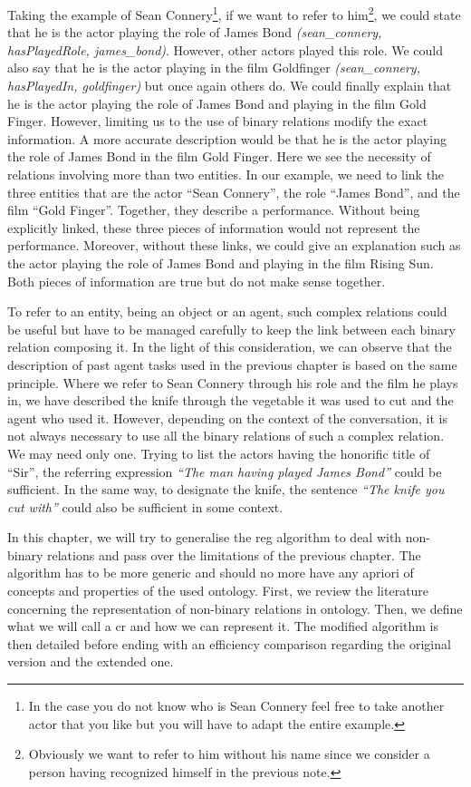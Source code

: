 Taking the example of Sean Connery\footnote{In the case you do not know who is Sean Connery feel free to take another actor that you like but you will have to adapt the entire example.}, if we want to refer to him\footnote{Obviously we want to refer to him without his name since we consider a person having recognized himself in the previous note.}, we could state that he is the actor playing the role of James Bond \textit{(sean\_connery, hasPlayedRole, james\_bond)}. However, other actors played this role. We could also say that he is the actor playing in the film Goldfinger \textit{(sean\_connery, hasPlayedIn, goldfinger)} but once again others do. We could finally explain that he is the actor playing the role of James Bond and playing in the film Gold Finger. However, limiting us to the use of binary relations modify the exact information. A more accurate description would be that he is the actor playing the role of James Bond in the film Gold Finger. Here we see the necessity of relations involving more than two entities. In our example, we need to link the three entities that are the actor ``Sean Connery'', the role ``James Bond'', and the film ``Gold Finger''. Together, they describe a performance. Without being explicitly linked, these three pieces of information would not represent the performance. Moreover, without these links, we could give an explanation such as the actor playing the role of James Bond and playing in the film Rising Sun. Both pieces of information are true but do not make sense together.

To refer to an entity, being an object or an agent, such complex relations could be useful but have to be managed carefully to keep the link between each binary relation composing it. In the light of this consideration, we can observe that the description of past agent tasks used in the previous chapter is based on the same principle. Where we refer to Sean Connery through his role and the film he plays in, we have described the knife through the vegetable it was used to cut and the agent who used it. However, depending on the context of the conversation, it is not always necessary to use all the binary relations of such a complex relation. We may need only one. Trying to list the actors having the honorific title of ``Sir'', the referring expression \textit{``The man having played James Bond''} could be sufficient. In the same way, to designate the knife, the sentence \textit{``The knife you cut with''} could also be sufficient in some context.

In this chapter, we will try to generalise the \acrshort{reg} algorithm to deal with non-binary relations and pass over the limitations of the previous chapter. The algorithm has to be more generic and should no more have any apriori of concepts and properties of the used ontology.
First, we review the literature concerning the representation of non-binary relations in ontology. Then, we define what we will call a \acrlong{cr} and how we can represent it. The modified algorithm is then detailed before ending with an efficiency comparison regarding the original version and the extended one.

